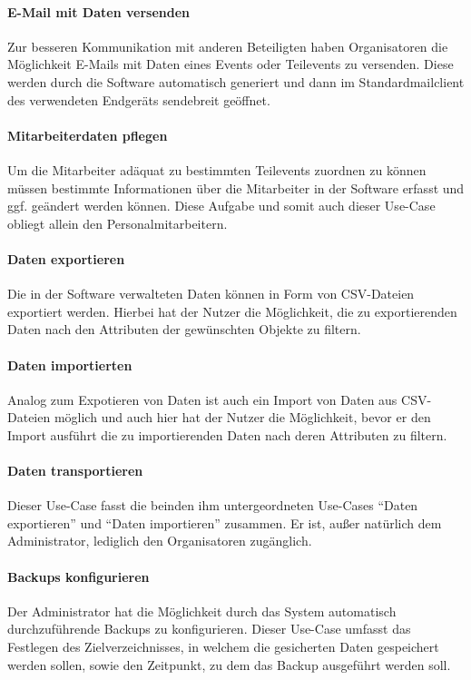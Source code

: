 \paragraph{E-Mail mit Daten versenden}
Zur besseren Kommunikation mit anderen Beteiligten haben Organisatoren die Möglichkeit E-Mails mit Daten eines Events oder Teilevents zu versenden. Diese werden durch die Software automatisch generiert und dann im Standardmailclient des verwendeten Endgeräts sendebreit geöffnet.

\paragraph{Mitarbeiterdaten pflegen}
Um die Mitarbeiter adäquat zu bestimmten Teilevents zuordnen zu können müssen bestimmte Informationen über die Mitarbeiter in der Software erfasst und ggf. geändert werden können. Diese Aufgabe und somit auch dieser Use-Case obliegt allein den Personalmitarbeitern.

\paragraph{Daten exportieren}
Die in der Software verwalteten Daten können in Form von CSV-Dateien exportiert werden. Hierbei hat der Nutzer die Möglichkeit, die zu exportierenden Daten nach den Attributen der gewünschten Objekte zu filtern.

\paragraph{Daten importierten}
Analog zum Expotieren von Daten ist auch ein Import von Daten aus CSV-Dateien möglich und auch hier hat der Nutzer die Möglichkeit, bevor er den Import ausführt die zu importierenden Daten nach deren Attributen zu filtern.

\paragraph{Daten transportieren}
Dieser Use-Case fasst die beinden ihm untergeordneten Use-Cases \enquote{Daten exportieren} und \enquote{Daten importieren} zusammen. Er ist, außer natürlich dem Administrator, lediglich den Organisatoren zugänglich.

\paragraph{Backups konfigurieren}
Der Administrator hat die Möglichkeit durch das System automatisch durchzuführende Backups zu konfigurieren. Dieser Use-Case umfasst das Festlegen des Zielverzeichnisses, in welchem die gesicherten Daten gespeichert werden sollen, sowie den Zeitpunkt, zu dem das Backup ausgeführt werden soll.

